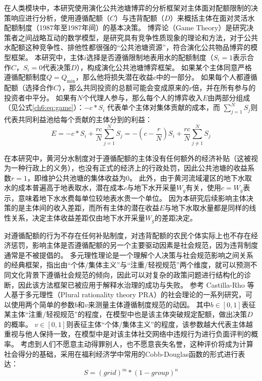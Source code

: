 在人类模块中，本研究使用演化公共池塘博弈的分析框架对主体面对配额限制的决策响应进行分析，使用遵循配额（$C$）与违背配额（$D$）来概括主体在面对灵活水配额制度（1987年至1987年间）的基本决策。
博弈论（Game Theory）是研究决策者之间战略互动的数学模型，是研究具有竞争性质现象的理论和方法，对于公共水配额这种竞争性、排他性都很强的“公共池塘资源”，符合演化公共物品博弈的模型框架\cite{ostrom2009, traulsen2010}。
本研究中，主体$i$选择是否遵循限制地表用水的配额制度（$S_i = 1$表示合作$C$，$S_i=0$代表决策$D$），构成演化公共池塘博弈框架。
如果某个主体同意严格遵循配额制度$Q = Q_{\min}$，那么他将损失潜在收益$c$中的一部分。
如果每个人都遵循配额（选择合作$C$），那么共同投资的总额可能会变成原来的$r$倍，并在所有参与的投资者中平分。
如果有$N$个代理人参与，那么每个人的博弈收入$E$由两部分组成（见公式\ref{ch6:eq:game}）：$-c*S_i$ 代表单个主体对集体贡献的成本，而 $\sum_{j=1}^N S_j$则代表共同利益池给每个贡献的主体分到的利益：
\begin{equation}
    \label{ch6:eq:game}
    E=-c * S_i+\frac{r c}{N} \sum_{j=1}^N S_j=-\left(c-\frac{r}{N}\right) S_i+\frac{r c}{N} \sum_{j \neq 1}^N S_j
\end{equation}

在本研究中，黄河分水制度对于遵循配额的主体没有任何额外的经济补贴（这被视为一种行政上的义务），也没有正式的经济上的行政处罚，因此公共池塘的收益系数$r = 1$，即维护公共池塘的集体收益为$0$。
此外，由于黄河流域灌区的地下水取水的成本普遍高于地表取水，潜在成本$c$与地下水开采量$W_g$有关，使用$c = W_g$表示，意味着地下水水费每单位较地表水贵一个单位。
因为本研究后续影响主体决策的是主体间的收入差距，而所有主体的潜在收益$E$与地下水取水量都是同样的线性关系，决定主体收益差距仅由地下水开采量$W_g$的差距决定。

对遵循配额的行为不存在任何补贴制度，对违背配额的农民个体实际上也不存在经济惩罚，影响主体是否遵循配额的另一个主要驱动因素是社会规范，因为违背制度通常是不被提倡的。
多元理性理论是一个理解个人决策与社会规范影响之间关系的经典框架，指出由“个体/集体主义”与“注重/轻视规范”两个维度，就可以预测不同文化背景下遵循社会规范的倾向\cite{verweij2015}，因此可以对复杂的政策问题进行结构化的诊断，因此该方法框架已被应用于解释水治理的成功与失败。
参考 Castilla-Rho 等人基于多元理性（Plural rationality theory PRA）的社会理论的一系列研究，可以使用两个简单的参数$b$和$v$来测量主体遵循制度规范的动因\cite{castillarho2015, castillarho2017, castillarho2020}。
其中$b\in[0, 1]$表征某主体“注重/轻视规范”的程度，在模型中也是该主体突破规定配额，做出决策$D$的概率。
$v \in [0, 1]$则表征主体“个体/集体主义”的程度，该参数越大代表主体越重视与他人保持一致，在模型中是对该主体社交网络中违规行为进行负面评判的概率。
考虑到人们不愿意主动得罪别人，也不愿意丧失名誉，这种评价将成为计算社会得分的基础，采用在福利经济学中常用的Cobb-Douglas函数的形式进行表达：
\begin{equation}
    S = {(grid)}^m * {(1 - group)}^n
    \label{ch6:eq:society}
\end{equation}

